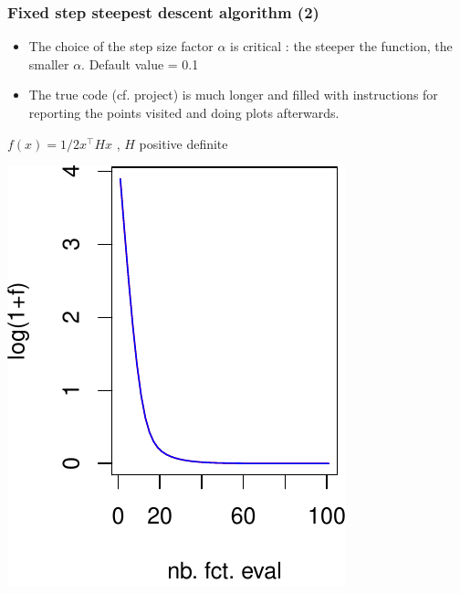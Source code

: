 \documentclass[12pt]{beamer}
\begin{document}
\begin{frame}
\frametitle{Fixed step steepest descent algorithm (2)} 
\begin{itemize}
\item The choice of the step size factor $\alpha$ is critical : the steeper the function, the smaller $\alpha$. Default value = 0.1
\item The true code (cf. project) is much longer and filled with instructions for reporting the points visited and doing plots afterwards.
\end{itemize}
\vspace{-0.5cm}
\begin{center}
{\scriptsize $f(x) = 1/2 x^\top H x$ , $H$ positive definite}\\
\begin{minipage}[b]{0.3\textwidth}
\includegraphics[width=\textwidth]{gradient_quad_2d_f_alpha01-crop.pdf} 
\end{minipage}
\hspace{1.5cm}

\end{center}
\end{frame}
\end{document}
